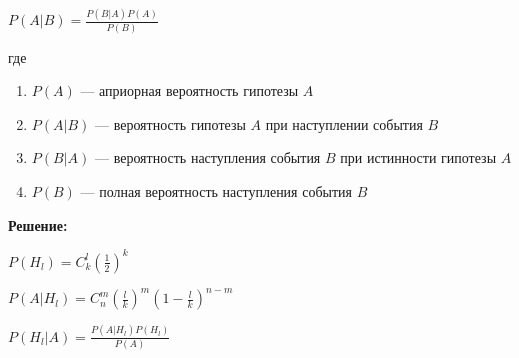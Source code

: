 \documentclass{article}
\begin{document}
$P(A|B) = \frac{P(B|A) P(A)}{P(B)}$

где

\begin{enumerate}
    \item $P(A)$ — априорная вероятность гипотезы $A$
    \item $P(A|B)$ — вероятность гипотезы $A$ при наступлении события $B$
    \item $P(B|A)$ — вероятность наступления события $B$ при истинности гипотезы $A$
    \item $P(B)$ — полная вероятность наступления события $B$
\end{enumerate}

\textbf{Решение:}

$P(H_{l}) = C_{k}^{l} (\frac{1}{2})^{k}$

$P(A|H_{l}) = C_{n}^{m} (\frac{l}{k})^{m} (1 - \frac{l}{k})^{n - m}$

$P(H_{l}|A) = \frac{P(A|H_{l}) P(H_{l})}{P(A)}$
\end{document}
